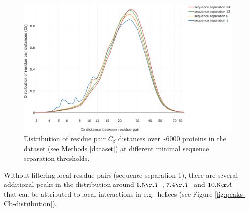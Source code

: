 \documentclass[12pt,a4paper,twoside]{book}
\newcommand{\Cb}{C_\beta}
\theoremstyle{definition}
\theoremstyle{definition}
\theoremstyle{remark}
\begin{document}
\begin{figure}
\includegraphics[width=1\linewidth]{img/dataset_statistics/Cb_distribution_all_data43579541_log} \caption{Distribution of residue pair \(\Cb\)
distances over \textasciitilde{}6000 proteins in the dataset (see
Methods \ref{dataset}) at different minimal sequence separation
thresholds.}\label{fig:Cb-distribution}
\end{figure}

Without filtering local residue pairs (sequence separation 1), there are
several additional peaks in the distribution around \(5.5\AA \; \;\),
\(7.4\AA \; \;\) and \(10.6\AA \; \;\) that can be attributed to local
interactions in e.g.~helices (see Figure
\ref{fig:peaks-Cb-distribution}).
\end{document}
